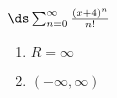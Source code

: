 {$\ds\sum_{n=0}^\infty \frac{(x+4)^{n}}{n!}$
}
{\begin{enumerate}
	\item $R=\infty$
	\item	$(-\infty,\infty)$
\end{enumerate}
}